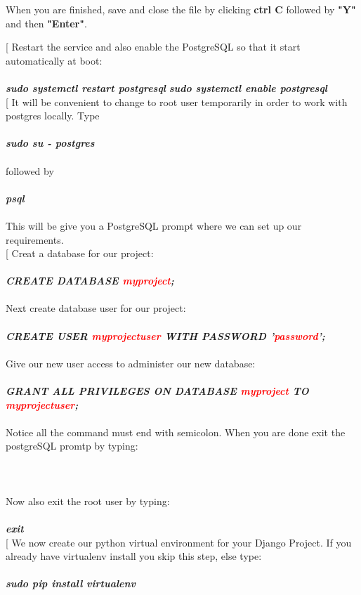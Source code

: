 \documentclass[a4paper]{article}
\makeatletter
\def\step{%
	\@ifnextchar[ \@myitem{\@noitemargtrue\@myitem[\@itemlabel]}}
\def\@myitem[#1]{\item[#1]\mbox{}\\}
\newenvironment{Step}{%
	\begin{enumerate}[label= \textbf {Step} \arabic*,align=left, leftmargin=1.0cm]%
	}{
\end{enumerate}%
}
\makeatother
\begin{document}
\begin{Step}
\begin{minipage}[t]{\linewidth}
	\medskip
	When you are finished, save and close the file by clicking \textbf{ctrl C} followed by \textbf{"Y"} and then \textbf{"Enter"}. \\
\end{minipage}

\step
Restart the service and also enable the PostgreSQL so that it start automatically at boot:\\ \\
\textbf{\emph{sudo systemctl restart postgresql}}
\textbf{\emph{sudo systemctl enable postgresql}}\\
\step
It will be convenient to change to root user temporarily in order to work with postgres locally. Type\\ \\
\textbf{\emph{sudo su - postgres}}\\ \\followed by\\ \\
\textbf{\emph{psql}}\\ \\
This will be give you a PostgreSQL prompt where we can set up our requirements.\\

\step
Creat a database for our project:\\ \\
\textbf{\emph{CREATE DATABASE \textcolor{red}{myproject};}}\\ \\
Next create database user for our project:\\ \\
\textbf{\emph{CREATE USER \textcolor{red}{myprojectuser} WITH PASSWORD '\textcolor{red}{password}';}}\\ \\
Give our new user access to administer our new database:\\ \\
\textbf{\emph{GRANT ALL PRIVILEGES ON DATABASE \textcolor{red}{myproject} TO \textcolor{red}{myprojectuser};}}\\ \\
Notice all the command must end with semicolon. When you are done exit the postgreSQL promtp by typing:\\ \\
\\ \\
Now also exit the root user by typing:\\ \\
\textbf{\emph{exit}}\\

\step
We now create our python virtual environment for your Django Project. If you already have virtualenv install you skip this step, else type:\\ \\
\textbf{\emph{sudo pip install virtualenv}}\\ \\


\end{Step}
	
\end{document}
